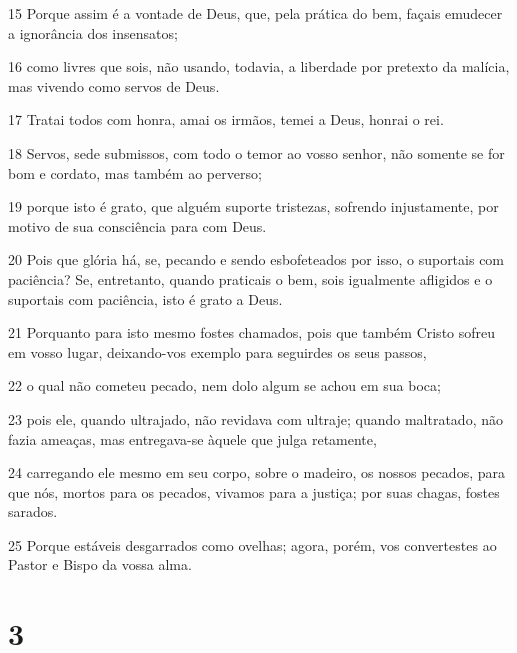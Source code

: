 \par 15 Porque assim é a vontade de Deus, que, pela prática do bem, façais emudecer a ignorância dos insensatos;
\par 16 como livres que sois, não usando, todavia, a liberdade por pretexto da malícia, mas vivendo como servos de Deus.
\par 17 Tratai todos com honra, amai os irmãos, temei a Deus, honrai o rei.
\par 18 Servos, sede submissos, com todo o temor ao vosso senhor, não somente se for bom e cordato, mas também ao perverso;
\par 19 porque isto é grato, que alguém suporte tristezas, sofrendo injustamente, por motivo de sua consciência para com Deus.
\par 20 Pois que glória há, se, pecando e sendo esbofeteados por isso, o suportais com paciência? Se, entretanto, quando praticais o bem, sois igualmente afligidos e o suportais com paciência, isto é grato a Deus.
\par 21 Porquanto para isto mesmo fostes chamados, pois que também Cristo sofreu em vosso lugar, deixando-vos exemplo para seguirdes os seus passos,
\par 22 o qual não cometeu pecado, nem dolo algum se achou em sua boca;
\par 23 pois ele, quando ultrajado, não revidava com ultraje; quando maltratado, não fazia ameaças, mas entregava-se àquele que julga retamente,
\par 24 carregando ele mesmo em seu corpo, sobre o madeiro, os nossos pecados, para que nós, mortos para os pecados, vivamos para a justiça; por suas chagas, fostes sarados.
\par 25 Porque estáveis desgarrados como ovelhas; agora, porém, vos convertestes ao Pastor e Bispo da vossa alma.

\chapter{3}

